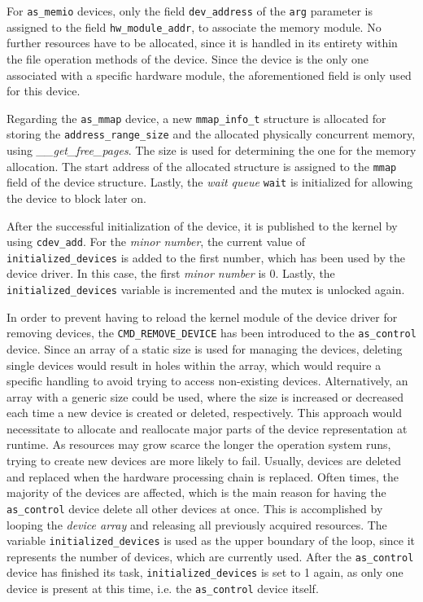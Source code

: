 For \texttt{as\_memio} devices, only the field \texttt{dev\_address} of the \texttt{arg} parameter is assigned to the field  \texttt{hw\_module\_addr}, to associate the memory module.
No further resources have to be allocated, since it is handled in its entirety within the file operation methods of the device.
Since the device is the only one associated with a specific hardware module, the aforementioned field is only used for this device.

Regarding the \texttt{as\_mmap} device, a new \texttt{mmap\_info\_t} structure is allocated for storing the \texttt{address\_range\_size} and the allocated physically concurrent memory, using \textit{\_\_get\_free\_pages}.
The size is used for determining the one for the memory allocation.
The start address of the allocated structure is assigned to the \texttt{mmap} field of the device structure.
Lastly, the \textit{wait queue} \texttt{wait} is initialized for allowing the device to block later on.

After the successful initialization of the device, it is published to the kernel by using \texttt{cdev\_add}.
For the \textit{minor number}, the current value of \texttt{initialized\_devices} is added to the first number, which has been used by the device driver.
In this case, the first \textit{minor number} is 0.
Lastly, the \texttt{initialized\_devices} variable is incremented and the mutex is unlocked again.


In order to prevent having to reload the kernel module of the \asterics device driver for removing devices, the \texttt{CMD\_REMOVE\_DEVICE} has been introduced to the \texttt{as\_control} device.
Since an array of a static size is used for managing the devices, deleting single devices would result in holes within the array, which would require a specific handling to avoid trying to access non-existing devices.
Alternatively, an array with a generic size could be used, where the size is increased or decreased each time a new device is created or deleted, respectively.
This approach would necessitate to allocate and reallocate major parts of the device representation at runtime.
As resources may grow scarce the longer the operation system runs, trying to create new devices are more likely to fail.
Usually, devices are deleted and replaced when the hardware processing chain is replaced.
Often times, the majority of the devices are affected, which is the main reason for having the \texttt{as\_control} device delete all other devices at once.
This is accomplished by looping the \textit{device array} and releasing all previously acquired resources.
The variable \texttt{initialized\_devices} is used as the upper boundary of the loop, since it represents the number of devices, which are currently used.
After the \texttt{as\_control} device has finished its task, \texttt{initialized\_devices} is set to 1 again, as only one device is present at this time, i.e. the \texttt{as\_control} device itself.

